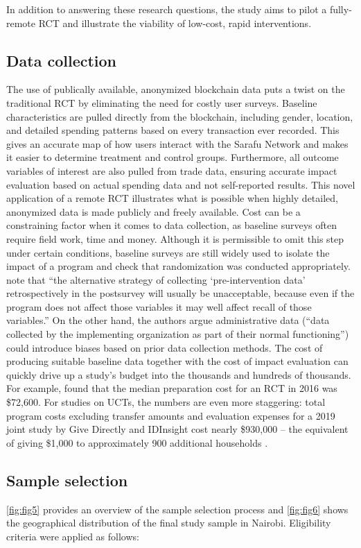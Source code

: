 \documentclass[12pt]{article}
\begin{document}
In addition to answering these research questions, the study aims to pilot a fully-remote RCT and illustrate the viability of low-cost, rapid interventions.

\subsection{Data collection}
The use of publically available, anonymized blockchain data puts a twist on the traditional RCT by eliminating the need for costly user surveys. Baseline characteristics are pulled directly from the blockchain, including gender, location, and detailed spending patterns based on every transaction ever recorded. This gives an accurate map of how users interact with the Sarafu Network and makes it easier to determine treatment and control groups. Furthermore, all outcome variables of interest are also pulled from trade data, ensuring accurate impact evaluation based on actual spending data and not self-reported results. This novel application of a remote RCT illustrates what is possible when highly detailed, anonymized data is made publicly and freely available. Cost can be a constraining factor when it comes to data collection, as baseline surveys often require field work, time and money. Although it is permissible to omit this step under certain conditions, baseline surveys are still widely used to isolate the impact of a program and check that randomization was conducted appropriately. \cite{duflo2007using} note that “the alternative strategy of collecting ‘pre-intervention data’ retrospectively in the postsurvey will usually be unacceptable, because even if the program does not affect those variables it may well affect recall of those variables.” On the other hand, the authors argue administrative data (“data collected by the implementing organization as part of their normal functioning”) could introduce biases based on prior data collection methods. The cost of producing suitable baseline data together with the cost of impact evaluation can quickly drive up a study’s budget into the thousands and hundreds of thousands. For example, \citep{speich2019resource} found that the median preparation cost for an RCT in 2016 was \$72,600. For studies on UCTs, the numbers are even more staggering: total program costs excluding transfer amounts and evaluation expenses for a 2019 joint study by Give Directly and IDInsight cost nearly \$930,000 – the equivalent of giving \$1,000 to approximately 900 additional households \citep{cook2019cash}.

\subsection{Sample selection}
\autoref{fig:fig5} provides an overview of the sample selection process and \autoref{fig:fig6} shows the geographical distribution of the final study sample in Nairobi. Eligibility criteria were applied as follows:
\end{document}
